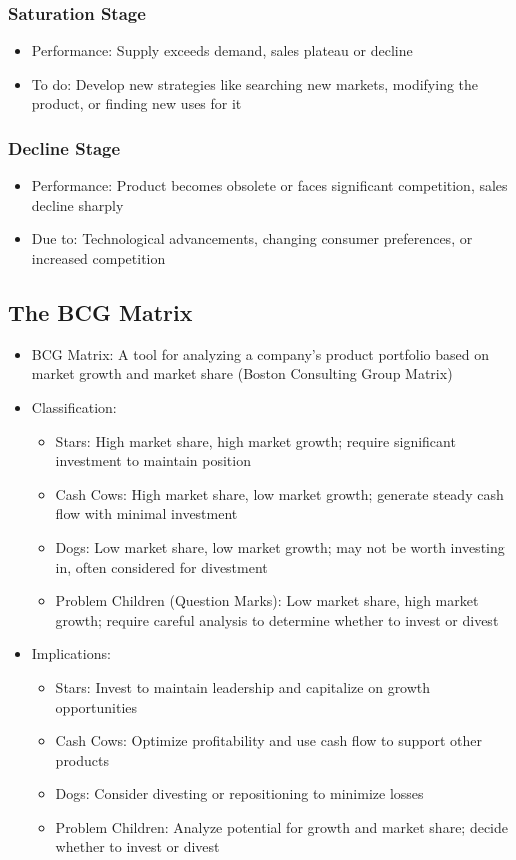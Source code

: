 \documentclass[openany,12pt,a4paper]{book}
\begin{document}
\subsubsection{Saturation Stage}
\begin{itemize}
    \item Performance: Supply exceeds demand, sales plateau or decline
    \item To do: Develop new strategies like searching new markets, modifying the product, or finding new uses for it
\end{itemize}
\subsubsection{Decline Stage}
\begin{itemize}
    \item Performance: Product becomes obsolete or faces significant competition, sales decline sharply
    \item Due to: Technological advancements, changing consumer preferences, or increased competition
\end{itemize}

\subsection{The BCG Matrix}
\begin{itemize}
    \item BCG Matrix: A tool for analyzing a company's product portfolio based on market growth and market share (Boston Consulting Group Matrix)
    \item Classification:
    \begin{itemize}
        \item Stars: High market share, high market growth; require significant investment to maintain position
        \item Cash Cows: High market share, low market growth; generate steady cash flow with minimal investment
        \item Dogs: Low market share, low market growth; may not be worth investing in, often considered for divestment
        \item Problem Children (Question Marks): Low market share, high market growth; require careful analysis to determine whether to invest or divest
    \end{itemize}
    \item Implications:
    \begin{itemize}
        \item Stars: Invest to maintain leadership and capitalize on growth opportunities
        \item Cash Cows: Optimize profitability and use cash flow to support other products
        \item Dogs: Consider divesting or repositioning to minimize losses
        \item Problem Children: Analyze potential for growth and market share; decide whether to invest or divest
    \end{itemize}
\end{itemize}
\end{document}
